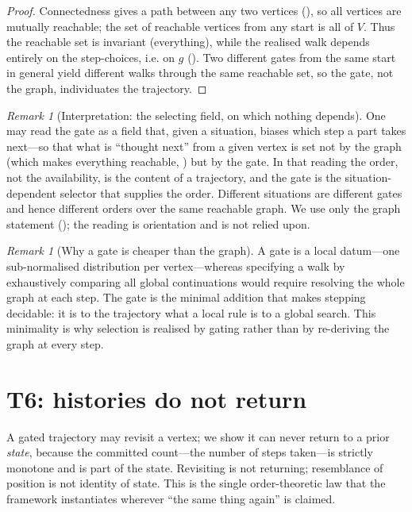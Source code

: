 \documentclass[11pt,a4paper]{article}
\theoremstyle{thmstyle}
\theoremstyle{definition}
\theoremstyle{remark}
\newtheorem{remark}[theorem]{Remark}
\newcommand{\V}{V}                        %
\newcommand{\gate}{g}                     %
\begin{document}
\begin{proof}
Connectedness gives a path between any two vertices (), so all
vertices are mutually reachable; the set of reachable vertices from any start is
all of $\V$. Thus the reachable set is invariant (everything), while the realised
walk depends entirely on the step-choices, i.e. on $\gate$ ().
Two different gates from the same start in general yield different walks through
the same reachable set, so the gate, not the graph, individuates the trajectory.
\end{proof}

\begin{remark}[Interpretation: the selecting field, on which nothing depends]
\label{rem:field}
One may read the gate as a field that, given a situation, biases which step a
part takes next---so that what is ``thought next'' from a given vertex is set not
by the graph (which makes everything reachable, ) but by
the gate. In that reading the order, not the availability, is the content of a
trajectory, and the gate is the situation-dependent selector that supplies the
order. Different situations are different gates and hence different orders over
the same reachable graph. We use only the graph statement
\textup{(}\textup{)}; the reading is
orientation and is not relied upon.
\end{remark}

\begin{remark}[Why a gate is cheaper than the graph]
\label{rem:gate-cheap}
A gate is a local datum---one sub-normalised distribution per vertex---whereas
specifying a walk by exhaustively comparing all global continuations would
require resolving the whole graph at each step. The gate is the minimal addition
that makes stepping decidable: it is to the trajectory what a local rule is to a
global search. This minimality is why selection is realised by gating rather than
by re-deriving the graph at every step.
\end{remark}


\section{T6: histories do not return}
\label{sec:monotone}

A gated trajectory may revisit a vertex; we show it can never return to a prior
\emph{state}, because the committed count---the number of steps taken---is
strictly monotone and is part of the state. Revisiting is not returning;
resemblance of position is not identity of state. This is the single
order-theoretic law that the framework instantiates wherever ``the same thing
again'' is claimed.
\end{document}

